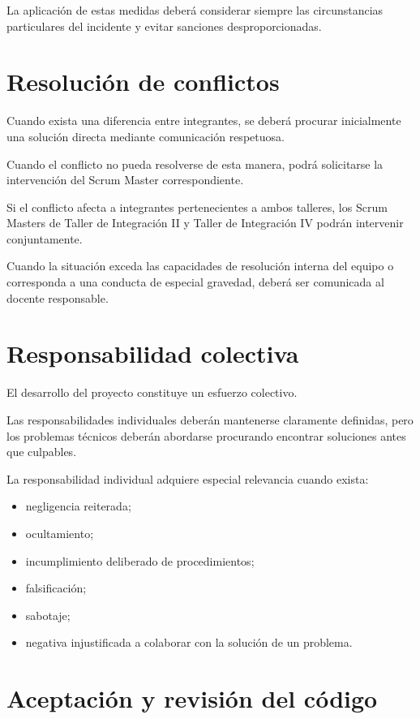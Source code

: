 \documentclass[12pt,a4paper]{article}
\begin{document}
La aplicación de estas medidas deberá considerar siempre las circunstancias particulares del incidente y evitar sanciones desproporcionadas.

\section{Resolución de conflictos}

Cuando exista una diferencia entre integrantes, se deberá procurar inicialmente una solución directa mediante comunicación respetuosa.

Cuando el conflicto no pueda resolverse de esta manera, podrá solicitarse la intervención del Scrum Master correspondiente.

Si el conflicto afecta a integrantes pertenecientes a ambos talleres, los Scrum Masters de Taller de Integración II y Taller de Integración IV podrán intervenir conjuntamente.

Cuando la situación exceda las capacidades de resolución interna del equipo o corresponda a una conducta de especial gravedad, deberá ser comunicada al docente responsable.

\section{Responsabilidad colectiva}

El desarrollo del proyecto constituye un esfuerzo colectivo.

Las responsabilidades individuales deberán mantenerse claramente definidas, pero los problemas técnicos deberán abordarse procurando encontrar soluciones antes que culpables.

La responsabilidad individual adquiere especial relevancia cuando exista:

\begin{itemize}
    \item negligencia reiterada;
    \item ocultamiento;
    \item incumplimiento deliberado de procedimientos;
    \item falsificación;
    \item sabotaje;
    \item negativa injustificada a colaborar con la solución de un problema.
\end{itemize}

\section{Aceptación y revisión del código}
\end{document}
